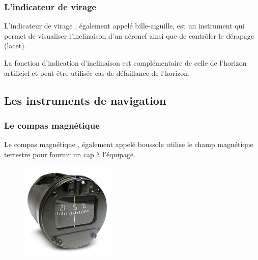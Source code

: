 	\begin{figure}[H]	
	\centering
	\end{figure}
	
	\subsubsection{L'indicateur de virage}
	L'\gls{indicateur de virage} , également appelé bille-aiguille, est un instrument qui permet de visualiser l'inclinaison d'un aéronef ainsi que de contrôler le dérapage (lacet).
	
	La fonction d'indication d'inclinaison est complémentaire de celle de l'horizon artificiel et peut-être utilisée cas de défaillance de l'horizon.
	
	\begin{figure}[H]	
	\centering
	\end{figure}
	
	
	\subsection{Les instruments de navigation}
	\subsubsection{Le compas magnétique}	
	Le \gls{compas magnétique} , également appelé \gls{boussole} utilise le champ magnétique terrestre pour fournir un cap à l'équipage.
	
	\begin{figure}[H]
  	\centering
    \includegraphics[width=0.4\textwidth]{01-EtudeAeronefs/img/compas.jpg}
	\end{figure}	
	

